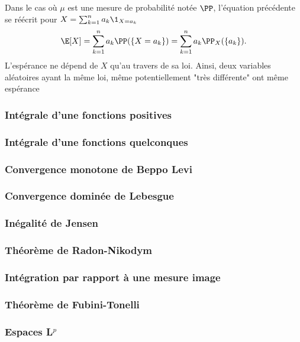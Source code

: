 Dans le cas où $\mu$ est une mesure de probabilité notée $\PP$, l'équation précédente se réécrit pour $X = \sum_{k=1}^n a_k \1_{X = a_k}$ $$ \E[X] = \sum_{k=1}^n a_k \PP(\{X = a_k\}) = \sum_{k=1}^n a_k \PP_X(\{a_k\}).$$
\bn
L'espérance ne dépend de $X$ qu'au travers de sa loi. Ainsi, deux variables aléatoires ayant la même loi, même potentiellement "très différente" ont même espérance 
\en
\subsubsection{Intégrale d'une fonctions positives}

\subsubsection{Intégrale d'une fonctions quelconques}

\subsubsection{Convergence monotone de Beppo Levi}

\subsubsection{Convergence dominée de Lebesgue}

\subsubsection{Inégalité de Jensen}

\subsubsection{Théorème de Radon-Nikodym}

\subsubsection{Intégration par rapport à une mesure image}

\bp[de transport]
\ep

\subsubsection{Théorème de Fubini-Tonelli}

\subsubsection{Espaces L$^p$}

